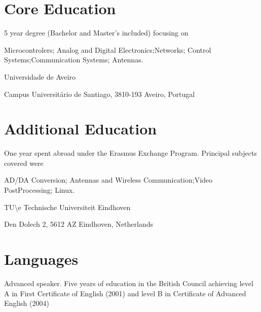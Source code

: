 





\section*{Core Education}


{
5 year degree (Bachelor and Master's included) focusing on

Microcontrolers; Analog and Digital Electronics;Networks; Control
Systems;Communication Systems; Antennas.
}


{
Universidade de Aveiro

Campus Universitário de Santiago, 3810-193 Aveiro, Portugal
}

\section*{Additional Education}


{
One year spent abroad under the Erasmus Exchange
Program. Principal subjects covered were

AD/DA Conversion; Antennas and Wireless Communication;Video PostProcessing;
Linux.
}

{
TU\textbackslash e Technische Universiteit Eindhoven

Den Dolech 2, 5612 AZ Eindhoven, Netherlands
}

\section*{Languages}


{
Advanced speaker. Five years of education in the British Council achieving
level A in First Certificate of English (2001) and level B in Certificate of
Advanced English (2004)
}

